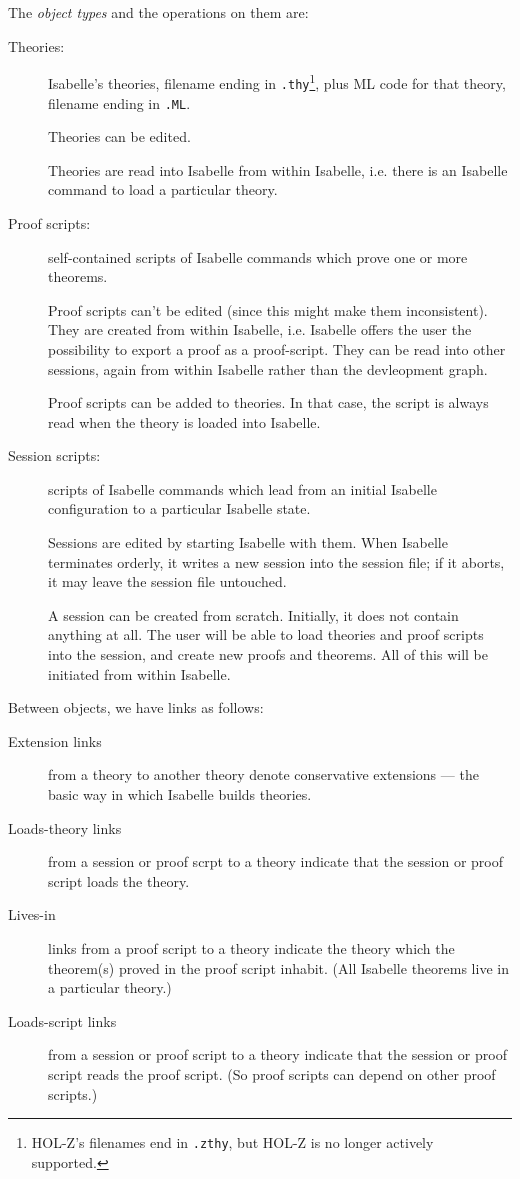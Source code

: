 \documentclass[a4paper]{article}
\begin{document}
The \emph{object types} and the operations on them are:
\begin{description}
\item[Theories:] Isabelle's theories, filename ending in
  \texttt{.thy}\footnote{HOL-Z's filenames end in \texttt{.zthy}, but
    HOL-Z is no longer actively supported.},
  plus ML code for that theory, filename ending in \texttt{.ML}. 
  
  Theories can be edited.
  
  Theories are read into Isabelle from within Isabelle, i.e. there is
  an Isabelle command to load a particular theory.

\item[Proof scripts:] self-contained scripts of Isabelle commands which 
  prove one or more theorems. 
  
  Proof scripts can't be edited (since this might make them
  inconsistent). They are created from within Isabelle, i.e. Isabelle
  offers the user the possibility to export a proof as a proof-script.
  They can be read into other sessions, again from within Isabelle
  rather than the devleopment graph.

  Proof scripts can be added to theories. In that case, the script is
  always read when the theory is loaded into Isabelle.

\item[Session scripts:] scripts of Isabelle commands which lead from an
  initial Isabelle configuration to a particular Isabelle state.  
  
  Sessions are edited by starting Isabelle with them. When Isabelle
  terminates orderly, it writes a new session into the session file;
  if it aborts, it may leave the session file untouched.

  A session can be created from scratch. Initially, it does not
  contain anything at all. The user will be able to load theories and
  proof scripts into the session, and create new proofs and theorems.
  All of this will be initiated from within Isabelle.
\end{description}


Between objects, we have links as follows:
\begin{description}
\item[Extension links] from a theory to another theory denote
  conservative extensions --- the basic way in which Isabelle builds
  theories.
\item[Loads-theory links] from a session or proof scrpt to a theory
  indicate that the  session or proof script loads the theory. 
\item[Lives-in] links from a proof script to a theory indicate the
  theory which the theorem(s) proved in the proof script inhabit. (All 
  Isabelle theorems live in a particular theory.) 
\item[Loads-script links]  from a session or proof script to a theory
  indicate that the session or proof script reads the proof
  script. (So proof scripts can depend on other proof scripts.)
\end{description}
\end{document}
